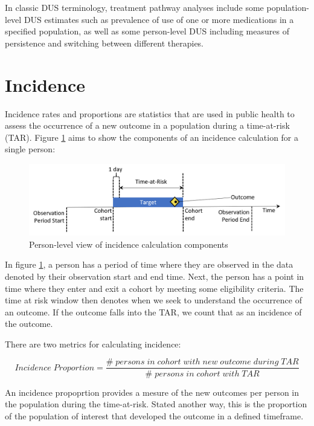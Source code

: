 \documentclass[11pt]{book}
\theoremstyle{definition}
\theoremstyle{definition}
\theoremstyle{definition}
\theoremstyle{remark}
\begin{document}
In classic DUS terminology, treatment pathway analyses include some population-level DUS estimates such as prevalence of use of one or more medications in a specified population, as well as some person-level DUS including measures of persistence and switching between different therapies.

\hypertarget{incidence}{%
\section{Incidence}\label{incidence}}

Incidence rates and proportions are statistics that are used in public health to assess the occurrence of a new outcome in a population during a time-at-risk (TAR). Figure \ref{fig:incidenceTimeline} aims to show the components of an incidence calculation for a single person: 

\begin{figure}

{\centering \includegraphics[width=1\linewidth]{images/Characterization/incidenceTimeline} 

}

\caption{Person-level view of incidence calculation components}\label{fig:incidenceTimeline}
\end{figure}

In figure \ref{fig:incidenceTimeline}, a person has a period of time where they are observed in the data denoted by their observation start and end time. Next, the person has a point in time where they enter and exit a cohort by meeting some eligibility criteria. The time at risk window then denotes when we seek to understand the occurrence of an outcome. If the outcome falls into the TAR, we count that as an incidence of the outcome.

There are two metrics for calculating incidence:

\[ 
Incidence\;Proportion = \frac{\#\;persons\;in\;cohort\;with\;new\;outcome\;during\;TAR}{\#\;persons\;in\;cohort\;with\;TAR}
\]

An incidence propoprtion provides a mesure of the new outcomes per person in the population during the time-at-risk. Stated another way, this is the proportion of the population of interest that developed the outcome in a defined timeframe.
\end{document}
